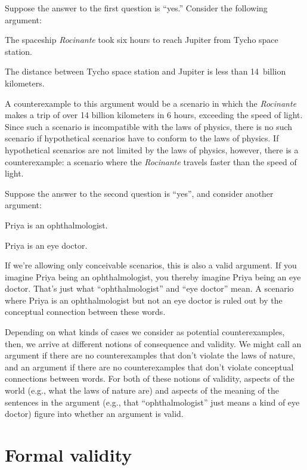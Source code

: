 Suppose the answer to the first question is ``yes.'' Consider the following argument:
	\begin{earg}
		\item[] The spaceship \textit{Rocinante} took six hours to reach Jupiter from Tycho space station.
		\item[\texttherefore] The distance between Tycho space station and Jupiter is less than 14~billion kilometers.
	\end{earg}
A counterexample to this argument would be a scenario in which the \textit{Rocinante} makes a trip of over 14 billion kilometers in 6 hours, exceeding the speed of light. Since such a scenario is incompatible with the laws of physics, there is no such scenario if hypothetical scenarios have to conform to the laws of physics.  If hypothetical scenarios are not limited by the laws of physics, however, there is a counterexample: a scenario where the \textit{Rocinante} travels faster than the speed of light.

Suppose the answer to the second question is ``yes'', and consider another argument:
	\begin{earg}
		\item[] Priya is an ophthalmologist.
		\item[\texttherefore] Priya is an eye doctor.
	\end{earg}
If we're allowing only conceivable scenarios, this is also a valid argument. If you imagine Priya being an ophthalmologist, you thereby imagine Priya being an eye doctor. That's just what ``ophthalmologist'' and ``eye doctor'' mean.  A scenario where Priya is an ophthalmologist but not an eye doctor is ruled out by the conceptual connection between these words.

Depending on what kinds of cases we consider as potential counterexamples, then, we arrive at different notions of consequence and validity. We might call an argument  if there are no counterexamples that don't violate the laws of nature, and an argument  if there are no counterexamples that don't violate conceptual connections between words.
For both of these notions of validity, aspects of the world (e.g., what the laws of nature are) and aspects of the meaning of the sentences in the argument (e.g., that ``ophthalmologist'' just means a kind of eye doctor) figure into whether an argument is valid.

\section{Formal validity}\label{s:FormalValidity}

